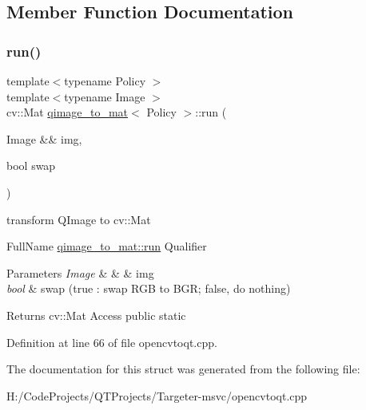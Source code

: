 \subsection{Member Function Documentation}
\mbox{\label{structqimage__to__mat_abd72ef7629c43797b7afd8deb3e4b4b1}} 
\subsubsection{\texorpdfstring{run()}{run()}}
{\footnotesize\ttfamily template$<$typename Policy $>$ \\
template$<$typename Image $>$ \\
cv\+::\+Mat \hyperlink{structqimage__to__mat}{qimage\+\_\+to\+\_\+mat}$<$ Policy $>$\+::run (\begin{DoxyParamCaption}\item[{Image \&\&}]{img,  }\item[{bool}]{swap }\end{DoxyParamCaption})\hspace{0.3cm}{\ttfamily [static]}}

transform Q\+Image to cv\+::\+Mat

Full\+Name \hyperlink{structqimage__to__mat_abd72ef7629c43797b7afd8deb3e4b4b1}{qimage\+\_\+to\+\_\+mat\+::run} Qualifier 
\begin{DoxyParams}{Parameters}
{\em Image} & \& \& img \\
\hline
{\em bool} & swap (true \+: swap R\+GB to B\+GR; false, do nothing) \\
\hline
\end{DoxyParams}
\begin{DoxyReturn}{Returns}
cv\+::\+Mat Access public static 
\end{DoxyReturn}


Definition at line 66 of file opencvtoqt.\+cpp.



The documentation for this struct was generated from the following file\+:\begin{DoxyCompactItemize}
\item 
H\+:/\+Code\+Projects/\+Q\+T\+Projects/\+Targeter-\/msvc/opencvtoqt.\+cpp\end{DoxyCompactItemize}
